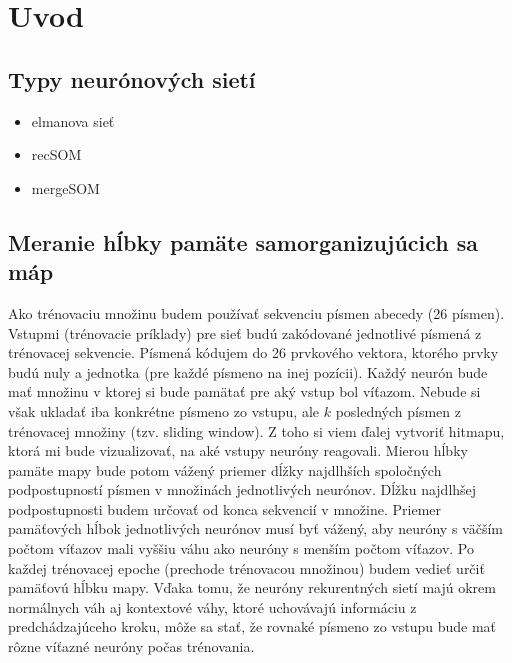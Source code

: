 \chapter{Uvod}


\section{Typy neurónových sietí}
\begin{itemize}
	\item elmanova sieť
	\item recSOM
	\item mergeSOM
\end{itemize}

\section{Meranie hĺbky pamäte samorganizujúcich sa máp}
Ako trénovaciu množinu budem používať sekvenciu písmen abecedy (26 písmen).
Vstupmi (trénovacie príklady) pre sieť budú zakódované jednotlivé písmená z trénovacej sekvencie.
Písmená kódujem do 26 prvkového vektora, ktorého prvky budú nuly a jednotka (pre každé písmeno na inej pozícii).
Každý neurón bude mať množinu v ktorej si bude pamätať pre aký vstup bol víťazom. Nebude si však ukladať iba konkrétne písmeno zo vstupu, ale $k$ posledných písmen z trénovacej množiny (tzv. sliding window). 
Z toho si viem ďalej vytvoriť hitmapu, ktorá mi bude vizualizovať, na aké vstupy neuróny reagovali.
Mierou hĺbky pamäte mapy bude potom vážený priemer dĺžky najdlhších spoločných podpostupností písmen v množinách jednotlivých neurónov. Dĺžku najdlhšej podpostupnosti budem určovať od konca sekvencií v množine. Priemer pamäťových hĺbok jednotlivých neurónov musí byť vážený, aby neuróny s väčším počtom víťazov mali vyššiu váhu ako neuróny s menším počtom víťazov.
Po každej trénovacej epoche (prechode trénovacou množinou) budem vedieť určiť pamäťovú hĺbku mapy.
Vďaka tomu, že neuróny rekurentných sietí majú okrem normálnych váh aj kontextové váhy, ktoré uchovávajú informáciu z predchádzajúceho kroku,  môže sa stať, že rovnaké písmeno zo vstupu bude mať rôzne víťazné neuróny počas trénovania.










